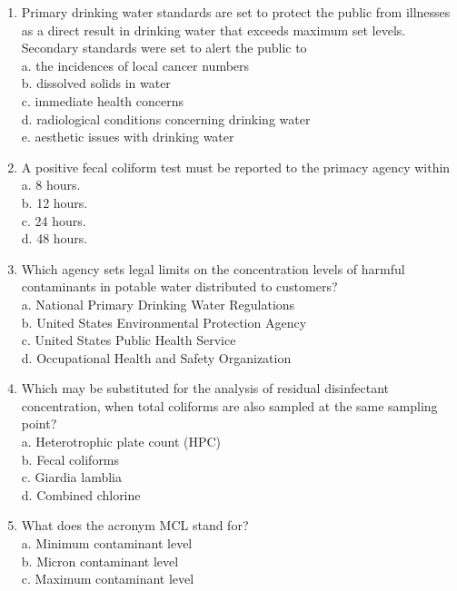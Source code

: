 \begin{enumerate}
\item Primary drinking water standards are set to protect the public from illnesses as a direct result in drinking water that exceeds maximum set levels. Secondary standards were set to alert the public to\\
a. the incidences of local cancer numbers\\
b. dissolved solids in water\\
c. immediate health concerns\\
d. radiological conditions concerning drinking water\\
e. aesthetic issues with drinking water\\
\item A positive fecal coliform test must be reported to the primacy agency within\\
a. 8 hours.\\
b. 12 hours.\\
c. 24 hours.\\
d. 48 hours.\\
\item Which agency sets legal limits on the concentration levels of harmful contaminants in potable water distributed to customers?\\
a. National Primary Drinking Water Regulations\\
b. United States Environmental Protection Agency\\
c. United States Public Health Service\\
d. Occupational Health and Safety Organization\\
\item Which may be substituted for the analysis of residual disinfectant concentration, when total coliforms are also sampled at the same sampling point?\\
a. Heterotrophic plate count (HPC)\\
b. Fecal coliforms\\
c. Giardia lamblia\\
d. Combined chlorine\\
\item What does the acronym MCL stand for?\\
a. Minimum contaminant level\\
b. Micron contaminant level\\
c. Maximum contaminant level\\

\end{enumerate}
